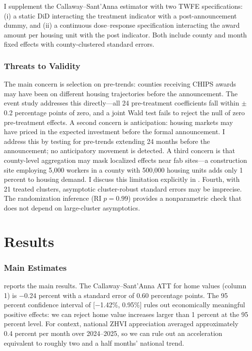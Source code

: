 \documentclass[12pt]{article}
\begin{document}
I supplement the Callaway--Sant'Anna estimator with two TWFE specifications: (i) a static DiD interacting the treatment indicator with a post-announcement dummy, and (ii) a continuous dose--response specification interacting the award amount per housing unit with the post indicator. Both include county and month fixed effects with county-clustered standard errors.

\subsubsection*{Threats to Validity} The main concern is selection on pre-trends: counties receiving CHIPS awards may have been on different housing trajectories before the announcement. The event study addresses this directly---all 24 pre-treatment coefficients fall within $\pm$0.2 percentage points of zero, and a joint Wald test fails to reject the null of zero pre-treatment effects. A second concern is anticipation: housing markets may have priced in the expected investment before the formal announcement. I address this by testing for pre-trends extending 24 months before the announcement; no anticipatory movement is detected. A third concern is that county-level aggregation may mask localized effects near fab sites---a construction site employing 5,000 workers in a county with 500,000 housing units adds only 1 percent to housing demand. I discuss this limitation explicitly in . Fourth, with 21 treated clusters, asymptotic cluster-robust standard errors may be imprecise. The randomization inference (RI $p = 0.99$) provides a nonparametric check that does not depend on large-cluster asymptotics.

\section{Results}
\label{sec:results}

\subsubsection*{Main Estimates}  reports the main results. The Callaway--Sant'Anna ATT for home values (column 1) is $-$0.24 percent with a standard error of 0.60 percentage points. The 95 percent confidence interval of [$-$1.42\%, 0.95\%] rules out economically meaningful positive effects: we can reject home value increases larger than 1 percent at the 95 percent level. For context, national ZHVI appreciation averaged approximately 0.4 percent per month over 2024--2025, so we can rule out an acceleration equivalent to roughly two and a half months' national trend.
\end{document}
